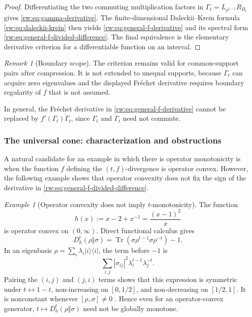 \documentclass[11pt]{article}
\theoremstyle{remark}
\newtheorem{remark}[remark]{Remark}
\newtheorem{example}[example]{Example}
\newcommand{\1}{\mathbbm{1}}
\begin{document}
\begin{proof}
Differentiating the two commuting multiplication factors in
$\Gamma_t=L_{\rho^{1-t}}R_{B_t}$ gives
\eqref{rw:eq:gamma-derivative}.  The finite-dimensional
Daleckii--Krein formula \eqref{rw:eq:daleckii-krein} then yields
\eqref{rw:eq:general-f-derivative} and its spectral form
\eqref{rw:eq:general-f-divided-difference}.  The final equivalence is
the elementary derivative criterion for a differentiable function on
an interval.
\end{proof}

\begin{remark}[Boundary scope]
The criterion remains valid for common-support pairs after
compression.  It is not extended to unequal supports, because
$\Gamma_t$ can acquire zero eigenvalues and the displayed
Fr\'echet derivative requires boundary regularity of $f$ that is not
assumed.
\end{remark}

In general, the Fréchet derivative in
\eqref{rw:eq:general-f-derivative} cannot be replaced by
$f'(\Gamma_t)\dot\Gamma_t$, since $\Gamma_t$ and $\dot\Gamma_t$
need not commute.

\subsubsection{The universal cone: characterization and obstructions}

A natural candidate for an example in which there is operator monotonicity is when the function $f$ defining the $(t,f)$-divergence is operator convex. However, the following example shows that operator convexity does not fix the
sign of the derivative in
\eqref{rw:eq:general-f-divided-difference}.

\begin{example}[Operator convexity does not imply $t$-monotonicity]
\label{rw:ex:weighted-chi-counterexample}
The function
\begin{equation}
 h(x):=x-2+x^{-1}=\frac{(x-1)^2}{x}
 \label{rw:eq:weighted-chi-generator}
\end{equation}
is operator convex on $(0,\infty)$.  Direct functional calculus
gives
\begin{equation}
 D_h^t(\rho\Vert\sigma)
 =\operatorname{Tr}(\sigma\rho^{t-1}\sigma\rho^{-t})-1.
 \label{rw:eq:weighted-chi-path}
\end{equation}
In an eigenbasis $\rho=\sum_i\lambda_i|i\rangle\langle i|$, the
term before $-1$ is
\begin{equation}
 \sum_{i,j}|\sigma_{ij}|^2
 \lambda_i^{t-1}\lambda_j^{-t}.
 \label{rw:eq:weighted-chi-spectral}
\end{equation}
Pairing the $(i,j)$ and $(j,i)$ terms shows that this expression
is symmetric under $t\leftrightarrow1-t$, non-increasing on
$[0,1/2]$, and non-decreasing on $[1/2,1]$.  It is nonconstant
whenever $[\rho,\sigma]\neq0$ \cite[Proposition~8]{temme2010}.  Hence even for an
operator-convex generator, $t\mapsto D_h^t(\rho\Vert\sigma)$ need not
be globally monotone.
\end{example}
\end{document}
